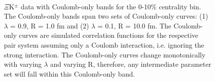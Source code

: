 \documentclass[../AnalysisNoteJBuxton.tex]{subfiles}
\begin{document}
\begin{figure}[h]
  \centering
  \\
  \caption[$\Xi$K$^{\pm}$ Data with Coulomb-Only Bands, 0-10\% Centrality]{$\Xi$K$^{\pm}$ data with Coulomb-only bands for the 0-10\% centrality bin.  The Coulomb-only bands span two sets of Coulomb-only curves: (1) $\lambda$ = 0.9, R = 1.0 fm and (2) $\lambda$ = 0.1, R = 10.0 fm.  The Coulomb-only curves are simulated correlation functions for the respective pair system assuming only a Coulomb interaction, i.e. ignoring the strong interaction.  The Coulomb-only curves change monotonically with varying $\lambda$ and varying R, therefore, any intermediate parameter set will fall within this Coulomb-only band.}
  \label{fig:XiKchCoulombOnlyBand}
\end{figure}
\end{document}
